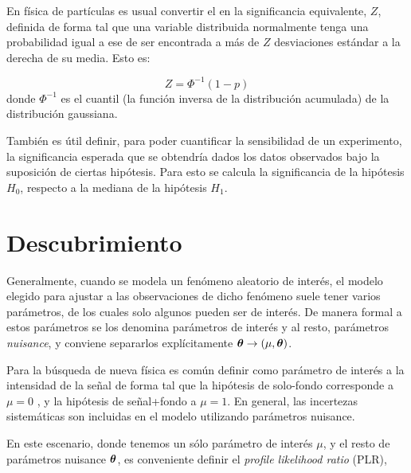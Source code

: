 En física de partículas es usual convertir el {\pvalue} en la significancia
equivalente, $Z$, definida de forma tal que una variable distribuida normalmente
tenga una probabilidad igual a ese {\pvalue} de ser encontrada a más de $Z$
desviaciones estándar a la derecha de su media. Esto es:

\begin{equation}
  Z = \Phi^{-1}(1-p)
\end{equation}
%
donde $\Phi^{-1}$ es el cuantil (la función inversa de la distribución
acumulada) de la distribución gaussiana.

También es útil definir, para poder cuantificar la sensibilidad de un experimento,
la significancia esperada que se obtendría dados los datos observados bajo la
suposición de ciertas hipótesis.
Para esto se calcula la significancia de la hipótesis $H_0$, respecto
a la mediana de la hipótesis $H_1$.


\section{Descubrimiento}


Generalmente, cuando se modela un fenómeno aleatorio de interés, el modelo
elegido para ajustar a las observaciones de dicho fenómeno suele tener varios
parámetros, de los cuales solo algunos pueden ser de interés. De manera formal a
estos parámetros se los denomina parámetros de interés y al resto, parámetros
\emph{nuisance}, y conviene separarlos explícitamente $\bm{\theta} \rightarrow (\mu, \bm{\theta})$.

Para la búsqueda de nueva física es común definir como parámetro de interés a la
intensidad de la señal de forma tal que la hipótesis de solo-fondo corresponde a
$\mu = 0$ , y la hipótesis de señal+fondo a $\mu = 1$.
En general, las incertezas sistemáticas son incluidas en el modelo
utilizando parámetros nuisance.

En este escenario, donde tenemos un sólo parámetro de interés
$\mu$, y el resto de parámetros nuisance $\bm{\theta}$, es conveniente
definir el \emph{profile likelihood ratio} (PLR),

